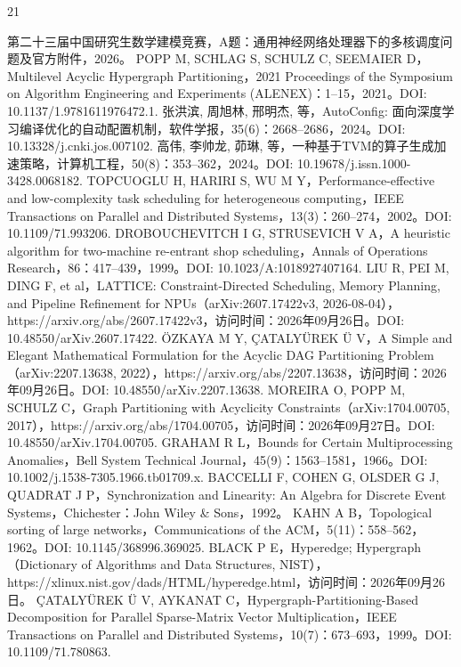 \documentclass[anonymous,withtoc]{gmcm2026}
\begin{document}
\FloatBarrier
{}\begin{thebibliography}{21}
\raggedright
{} 第二十三届中国研究生数学建模竞赛，A题：通用神经网络处理器下的多核调度问题及官方附件，2026。
 POPP M, SCHLAG S, SCHULZ C, SEEMAIER D，Multilevel Acyclic Hypergraph Partitioning，2021 Proceedings of the Symposium on Algorithm Engineering and Experiments (ALENEX)：1--15，2021。DOI: 10.1137/1.9781611976472.1.
 张洪滨, 周旭林, 邢明杰, 等，AutoConfig: 面向深度学习编译优化的自动配置机制，软件学报，35(6)：2668--2686，2024。DOI: 10.13328/j.cnki.jos.007102.
 高伟, 李帅龙, 茆琳, 等，一种基于TVM的算子生成加速策略，计算机工程，50(8)：353--362，2024。DOI: 10.19678/j.issn.1000-3428.0068182.
 TOPCUOGLU H, HARIRI S, WU M Y，Performance-effective and low-complexity task scheduling for heterogeneous computing，IEEE Transactions on Parallel and Distributed Systems，13(3)：260--274，2002。DOI: 10.1109/71.993206.
 DROBOUCHEVITCH I G, STRUSEVICH V A，A heuristic algorithm for two-machine re-entrant shop scheduling，Annals of Operations Research，86：417--439，1999。DOI: 10.1023/A:1018927407164.
 LIU R, PEI M, DING F, et al，LATTICE: Constraint-Directed Scheduling, Memory Planning, and Pipeline Refinement for NPUs（arXiv:2607.17422v3, 2026-08-04），https://arxiv.org/abs/2607.17422v3，访问时间：2026年09月26日。DOI: 10.48550/arXiv.2607.17422.
 ÖZKAYA M Y, ÇATALYÜREK Ü V，A Simple and Elegant Mathematical Formulation for the Acyclic DAG Partitioning Problem（arXiv:2207.13638, 2022），https://arxiv.org/abs/2207.13638，访问时间：2026年09月26日。DOI: 10.48550/arXiv.2207.13638.
 MOREIRA O, POPP M, SCHULZ C，Graph Partitioning with Acyclicity Constraints（arXiv:1704.00705, 2017），https://arxiv.org/abs/1704.00705，访问时间：2026年09月27日。DOI: 10.48550/arXiv.1704.00705.
 GRAHAM R L，Bounds for Certain Multiprocessing Anomalies，Bell System Technical Journal，45(9)：1563--1581，1966。DOI: 10.1002/j.1538-7305.1966.tb01709.x.
 BACCELLI F, COHEN G, OLSDER G J, QUADRAT J P，Synchronization and Linearity: An Algebra for Discrete Event Systems，Chichester：John Wiley \& Sons，1992。
 KAHN A B，Topological sorting of large networks，Communications of the ACM，5(11)：558--562，1962。DOI: 10.1145/368996.369025.
 BLACK P E，Hyperedge; Hypergraph（Dictionary of Algorithms and Data Structures, NIST），https://xlinux.nist.gov/dads/HTML/hyperedge.html，访问时间：2026年09月26日。
 ÇATALYÜREK Ü V, AYKANAT C，Hypergraph-Partitioning-Based Decomposition for Parallel Sparse-Matrix Vector Multiplication，IEEE Transactions on Parallel and Distributed Systems，10(7)：673--693，1999。DOI: 10.1109/71.780863.

\end{thebibliography}
\end{document}
